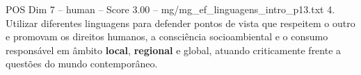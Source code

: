 \begin{textsample}{POS Dim 7 – human – Score 3.00 – mg/mg\_ef\_linguagens\_intro\_p13.txt}  \label{ex:f7_pos_014}
4.
Utilizar diferentes linguagens para defender pontos de vista que respeitem o outro e promovam os direitos humanos, a consciência socioambiental e o consumo responsável em âmbito \textbf{local}, \textbf{regional} e global, atuando criticamente frente a questões do mundo contemporâneo.

\end{textsample}
